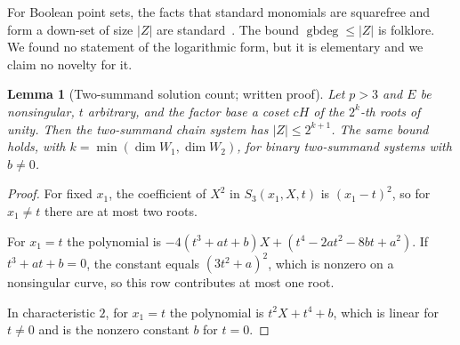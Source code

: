 \documentclass[11pt]{article}
\newtheorem{lemma}[theorem]{Lemma}
\theoremstyle{definition}\newtheorem{definition}[theorem]{Definition}
\theoremstyle{remark}\newtheorem{remark}[theorem]{Remark}
\newcommand{\gbdeg}{\operatorname{gbdeg}}
\begin{document}
For Boolean point sets, the facts that standard monomials are squarefree
and form a down-set of size $|Z|$ are standard~\cite{meszaros19}. The
bound $\gbdeg\le|Z|$ is folklore. We found no statement of the logarithmic
form, but it is elementary and we claim no novelty for it.

\begin{lemma}[Two-summand solution count; written proof]\label{lem:count2}
Let $p>3$ and $E$ be nonsingular, $t$ arbitrary, and the factor base a
coset $cH$ of the $2^k$-th roots of unity. Then the two-summand chain system
has $|Z|\le2^{k+1}$. The same bound holds, with $k=\min(\dim W_1,\dim W_2)$,
for binary two-summand systems with $b\ne0$.
\end{lemma}
\begin{proof}
For fixed $x_1$, the coefficient of $X^2$ in $S_3(x_1,X,t)$ is
$(x_1-t)^2$, so for $x_1\ne t$ there are at most two roots.

For $x_1=t$ the polynomial is $-4(t^3+at+b)X+(t^4-2at^2-8bt+a^2)$. If
$t^3+at+b=0$, the constant equals $(3t^2+a)^2$, which is nonzero on a
nonsingular curve, so this row contributes at most one root.

In characteristic $2$, for $x_1=t$ the polynomial is $t^2X+t^4+b$, which
is linear for $t\ne0$ and is the nonzero constant $b$ for $t=0$.
\end{proof}
\end{document}
